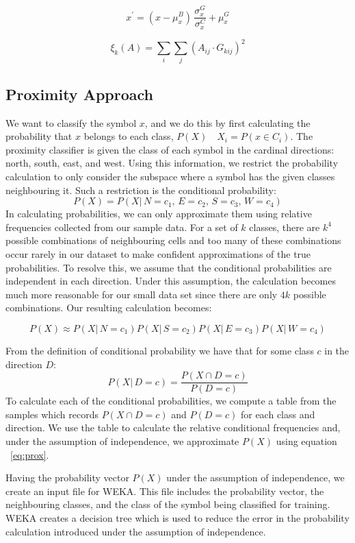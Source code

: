 \documentclass[preprint,3p,12pt]{elsarticle}
\begin{document}
\begin{equation} \label{eq:gold}
x^{\prime} = (x - \mu^{B}_{x}) \, \frac{\sigma^{G}_{x}}{\sigma^{C}_{x}} + \mu^{G}_{x}
\end{equation}

\[
\xi_{k}(A) = \sum_{i}\sum_{j}{(A_{ij} \cdot G_{kij})^{2}}
\]

\subsection{Proximity Approach}
\label{process:proximity}

We want to classify the symbol $x$, and we do this by first calculating the
probability that $x$ belongs to each class, $P(X)\quad X_i = P(x\!\in\! C_i)$.
The proximity classifier is given the class of each symbol in the
cardinal directions: north, south, east, and west. Using this information,
we restrict the probability calculation to only consider the subspace
where a symbol has the given classes neighbouring it. Such a restriction is
the conditional probability:
\[
P(X) = P(X|\,N\!=\!c_1,\,E\!=\!c_2,\,S\!=\!c_3,\,W\!=\!c_4)
\]
In calculating probabilities, we can only approximate them using relative
frequencies collected from our sample data. For a set of $k$ classes, there are $k^4$ possible combinations of neighbouring
cells and too many of these combinations occur rarely in our dataset to make
confident approximations of the true probabilities. To resolve this, we assume that
the conditional probabilities are independent in each direction. Under this
assumption, the calculation becomes much more reasonable for our small data set
since there are only $4k$ possible combinations. Our resulting calculation becomes:

\begin{equation} \label{eq:prox}
P(X) \approx P(X|\,N\!=\!c_1)P(X|\,S\!=\!c_2)P(X|\,E\!=\!c_3)P(X|\,W\!=\!c_4)
\end{equation}

From the definition of conditional probability we have that for some class $c$ in
the direction $D$:
\[ P(X|\,D\!=\!c) = \frac{P(X \cap D\!=\!c)}{P(D=c)} \]
To calculate each of the conditional probabilities,
we compute a table from the samples which records $P(X\cap D\!=\!c)$ and $P(D\!=\!c)$ for each class and direction.
We use the table to calculate the relative conditional frequencies and, under the assumption
of independence, we approximate $P(X)$ using equation ~\ref{eq:prox}.

Having the probability vector $P(X)$ under the assumption of independence, we create an input file for WEKA.
This file includes the probability vector, the neighbouring classes, and the class of the
symbol being classified for training. WEKA creates a decision tree which is used to reduce the error in the probability
calculation introduced under the assumption of independence.
\end{document}
